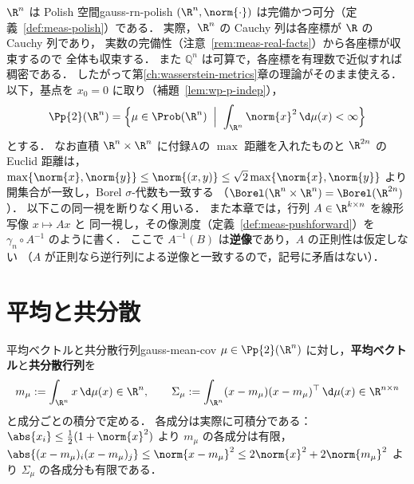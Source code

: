 \begin{remark}{$\R^n$ は Polish 空間}{gauss-rn-polish}
  $(\R^n,\norm{\cdot})$ は完備かつ可分（定義~\ref{def:meas-polish}）である．
  実際，$\R^n$ の Cauchy 列は各座標が $\R$ の Cauchy 列であり，
  実数の完備性（注意~\ref{rem:meas-real-facts}）から各座標が収束するので
  全体も収束する．
  また $\mathbb{Q}^n$ は可算で，各座標を有理数で近似すれば稠密である．
  したがって第\ref{ch:wasserstein-metrics}章の理論がそのまま使える．
  以下，基点を $x_0=0$ に取り（補題~\ref{lem:wp-p-indep}），
  \[
    \Pp{2}(\R^n)
    =\Bigl\{\mu\in\Prob(\R^n)\;\Bigm|\;\int_{\R^n}\norm{x}^2\,\d\mu(x)<\infty\Bigr\}
  \]
  とする．
  なお直積 $\R^n\times\R^n$ に付録Aの $\max$ 距離を入れたものと
  $\R^{2n}$ の Euclid 距離は，
  $\max\{\norm{x},\norm{y}\}\leq\norm{(x,y)}\leq\sqrt{2}\max\{\norm{x},\norm{y}\}$
  より開集合が一致し，Borel $\sigma$-代数も一致する
  （$\Borel(\R^n\times\R^n)=\Borel(\R^{2n})$）．
  以下この同一視を断りなく用いる．
  また本章では，行列 $A\in\R^{k\times n}$ を線形写像 $x\mapsto Ax$ と
  同一視し，その像測度（定義~\ref{def:meas-pushforward}）を
  $\gamma_n\circ A^{-1}$ のように書く．
  ここで $A^{-1}(B)$ は\textbf{逆像}であり，$A$ の正則性は仮定しない
  （$A$ が正則なら逆行列による逆像と一致するので，記号に矛盾はない）．
\end{remark}

\section{平均と共分散}
\label{sec:gauss-mean-cov}

\begin{definition}{平均ベクトルと共分散行列}{gauss-mean-cov}
  $\mu\in\Pp{2}(\R^n)$ に対し，\textbf{平均ベクトル}と\textbf{共分散行列}を
  \[
    m_\mu:=\int_{\R^n}x\,\d\mu(x)\in\R^n,
    \qquad
    \Sigma_\mu:=\int_{\R^n}(x-m_\mu)(x-m_\mu)^\top\,\d\mu(x)\in\R^{n\times n}
  \]
  と成分ごとの積分で定める．
  各成分は実際に可積分である：
  $\abs{x_i}\leq\frac{1}{2}(1+\norm{x}^2)$ より $m_\mu$ の各成分は有限，
  $\abs{(x-m_\mu)_i(x-m_\mu)_j}\leq\norm{x-m_\mu}^2
  \leq2\norm{x}^2+2\norm{m_\mu}^2$ より $\Sigma_\mu$ の各成分も有限である．
\end{definition}

